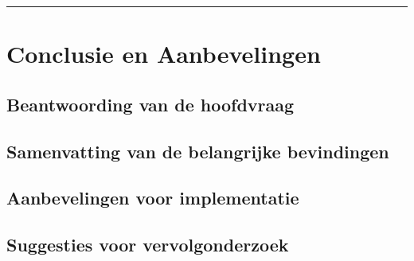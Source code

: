 \vspace{0.2cm}
{\color{gray}\hrule}
\section{Conclusie en Aanbevelingen}



\subsection{Beantwoording van de hoofdvraag}

\subsection{Samenvatting van de belangrijke bevindingen}

\subsection{Aanbevelingen voor implementatie}

\subsection{Suggesties voor vervolgonderzoek}



